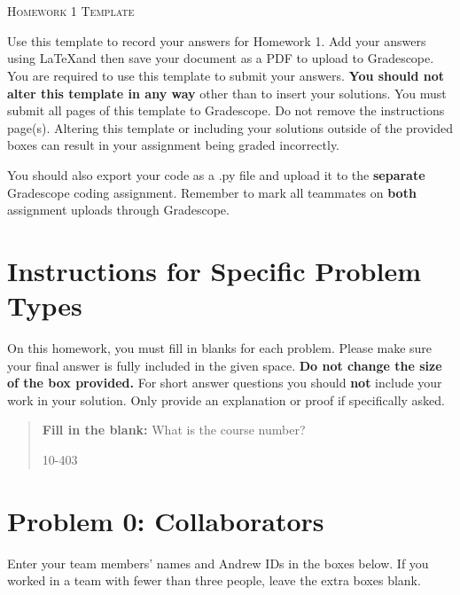 \documentclass[12pt]{article}
\begin{document}
\section*{}
\begin{center}
  \centerline{\textsc{\LARGE  Homework 1 Template}}
\end{center}

Use this template to record your answers for Homework 1.  Add your answers using \LaTeX and then save your document as a PDF to upload to Gradescope.  You are required to use this template to submit your answers.  \textbf{You should not alter this template in any way} other than to insert your solutions.  You must submit all \pageref{LastPage} pages of this template to Gradescope.  Do not remove the instructions page(s).  Altering this template or including your solutions outside of the provided boxes can result in your assignment being graded incorrectly.

You should also export your code as a .py file and upload it to the \textbf{separate} Gradescope coding assignment. Remember to mark all teammates on \textbf{both} assignment uploads through Gradescope.

\section*{Instructions for Specific Problem Types}

On this homework, you must fill in blanks for each problem. Please make sure your final answer is fully included in the given space.  \textbf{Do not change the size of the box provided.}  For short answer questions you should \textbf{not} include your work in your solution.  Only provide an explanation or proof if specifically asked.

\begin{quote}
\textbf{Fill in the blank:} What is the course number?

\begin{tcolorbox}[fit,height=1cm, width=4cm, blank, borderline={1pt}{-2pt},nobeforeafter]
    \begin{center} \end{center}
    10-403
    \end{tcolorbox}
\end{quote}

\newpage

\section*{Problem 0: Collaborators}
Enter your team members' names and Andrew IDs in the boxes below. If you worked in a team with fewer than three people, leave the extra boxes blank.
\end{document}
